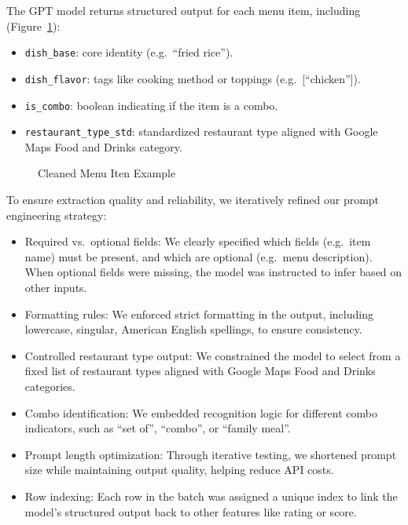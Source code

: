 \documentclass[
  11pt,
  a4paper,
  DIV=11,
  numbers=noendperiod]{scrartcl}
\providecommand{\tightlist}{%
  \setlength{\itemsep}{0pt}\setlength{\parskip}{0pt}}\usepackage{longtable,booktabs,array}
\begin{document}
The GPT model returns structured output for each menu item, including
(Figure~\ref{fig-cleaned-example}):

\begin{itemize}
\tightlist
\item
  \texttt{dish\_base}: core identity (e.g.~``fried rice'').
\item
  \texttt{dish\_flavor}: tags like cooking method or toppings
  (e.g.~{[}``chicken''{]}).
\item
  \texttt{is\_combo}: boolean indicating if the item is a combo.
\item
  \texttt{restaurant\_type\_std}: standardized restaurant type aligned
  with Google Maps Food and Drinks category.
\end{itemize}

\begin{figure}

\caption{\label{fig-cleaned-example}Cleaned Menu Iten Example}


\end{figure}%

To ensure extraction quality and reliability, we iteratively refined our
prompt engineering strategy:

\begin{itemize}
\tightlist
\item
  Required vs.~optional fields: We clearly specified which fields
  (e.g.~item name) must be present, and which are optional (e.g.~menu
  description). When optional fields were missing, the model was
  instructed to infer based on other inputs.
\item
  Formatting rules: We enforced strict formatting in the output,
  including lowercase, singular, American English spellings, to ensure
  consistency.
\item
  Controlled restaurant type output: We constrained the model to select
  from a fixed list of restaurant types aligned with Google Maps Food
  and Drinks categories.
\item
  Combo identification: We embedded recognition logic for different
  combo indicators, such as ``set of'', ``combo'', or ``family meal''.
\item
  Prompt length optimization: Through iterative testing, we shortened
  prompt size while maintaining output quality, helping reduce API
  costs.
\item
  Row indexing: Each row in the batch was assigned a unique index to
  link the model's structured output back to other features like rating
  or score.
\end{itemize}
\end{document}
